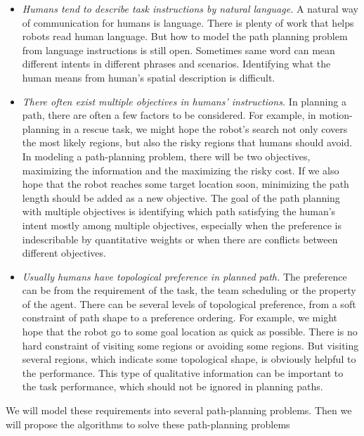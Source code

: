 \documentclass[phd]{byuprop}
\begin{document}
\begin{itemize}

\item {\em Humans tend to describe task instructions by natural language.}
A natural way of communication for humans is language.
There is plenty of work that helps robots read human language.
But how to model the path planning problem from language instructions is still open.
Sometimes same word can mean different intents in different phrases and scenarios. 
Identifying what the human means from human's spatial description is difficult.

\item {\em There often exist multiple objectives in humans' instructions.}
In planning a path, there are often a few factors to be considered.
For example, in motion-planning in a rescue task, we might hope the robot's search not only covers the most likely regions, but also the risky regions that humans should avoid.
In modeling a path-planning problem, there will be two objectives, maximizing the information and the maximizing the risky cost.
If we also hope that the robot reaches some target location soon, minimizing the path length should be added as a new objective.
The goal of the path planning with multiple objectives is identifying which path satisfying the human's intent mostly among multiple objectives,
especially when the preference is indescribable by quantitative weights or when there are conflicts between different objectives. 

\item {\em Usually humans have topological preference in planned path.}
The preference can be from the requirement of the task, the team scheduling or the property of the agent.
There can be several levels of topological preference, from a soft constraint of path shape to a preference ordering.
For example, we might hope that the robot go to some goal location as quick as possible.
There is no hard constraint of visiting some regions or avoiding some regions.
But visiting several regions, which indicate some topological shape, is obviously helpful to the performance.
This type of qualitative information can be important to the task performance, which should not be ignored in planning paths.

\end{itemize} 

We will model these requirements into several path-planning problems.
Then we will propose the algorithms to solve these path-planning problems
\end{document}

